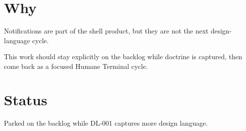 \section{Why}\label{record-351-why}

Notifications are part of the shell product, but they are not the next design-language cycle.

This work should stay explicitly on the backlog while doctrine is captured, then come back as a focused Humane Terminal cycle.

\section{Status}\label{record-351-status}

Parked on the backlog while DL-001 captures more design language.

